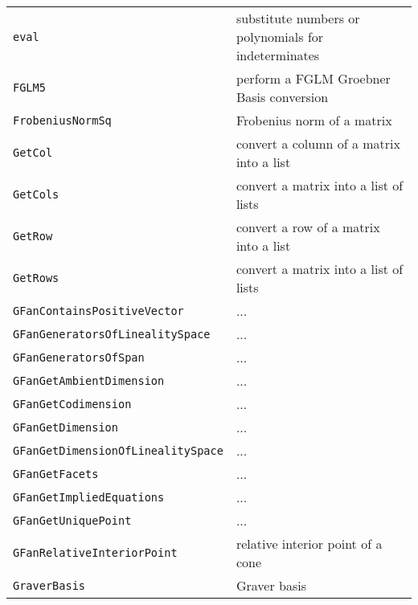 \documentclass[a4paper]{mybook}
\begin{document}
\begin{center}
\begin{longtable}{ll}
{\verb~eval~} &
      substitute numbers or polynomials for indeterminates\\
   
{\verb~FGLM5~} &
      perform a FGLM Groebner Basis conversion\\
   
{\verb~FrobeniusNormSq~} &
      Frobenius norm of a matrix\\
   
{\verb~GetCol~} &
      convert a column of a matrix into a list\\
   
{\verb~GetCols~} &
      convert a matrix into a list of lists\\
   
{\verb~GetRow~} &
      convert a row of a matrix into a list\\
   
{\verb~GetRows~} &
      convert a matrix into a list of lists\\
   
{\verb~GFanContainsPositiveVector~} &
      ...\\
   
{\verb~GFanGeneratorsOfLinealitySpace~} &
      ...\\
   
{\verb~GFanGeneratorsOfSpan~} &
      ...\\
   
{\verb~GFanGetAmbientDimension~} &
      ...\\
   
{\verb~GFanGetCodimension~} &
      ...\\
   
{\verb~GFanGetDimension~} &
      ...\\
   
{\verb~GFanGetDimensionOfLinealitySpace~} &
      ...\\
   
{\verb~GFanGetFacets~} &
      ...\\
   
{\verb~GFanGetImpliedEquations~} &
      ...\\
   
{\verb~GFanGetUniquePoint~} &
      ...\\
   
{\verb~GFanRelativeInteriorPoint~} &
      relative interior point of a cone\\
   
{\verb~GraverBasis~} &
      Graver basis\\
   

\end{longtable}
\end{center}
\end{document}
